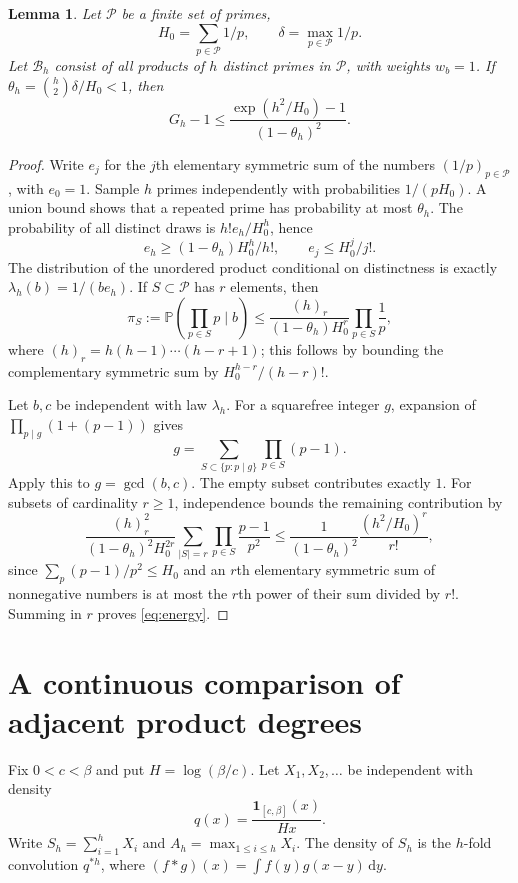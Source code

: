 \documentclass[11pt]{article}
\newtheorem{lemma}[theorem]{Lemma}
\theoremstyle{remark}\newtheorem{remark}[theorem]{Remark}
\newcommand{\Prob}{\mathbb P}
\newcommand{\ind}{\mathbf 1}
\newcommand{\dd}{\,\mathrm d}
\begin{document}
\begin{lemma}\label{lem:energy}
Let $\mathcal P$ be a finite set of primes,
\[
 H_0=\sum_{p\in\mathcal P}1/p,\qquad
 \delta=\max_{p\in\mathcal P}1/p.
\]
Let $\mathcal B_h$ consist of all products of $h$ distinct primes in $\mathcal P$, with weights $w_b=1$. If $\theta_h=\binom h2\delta/H_0<1$, then
\begin{equation}\label{eq:energy}
 G_h-1\le\frac{\exp(h^2/H_0)-1}{(1-\theta_h)^2}.
\end{equation}
\end{lemma}
\begin{proof}
Write $e_j$ for the $j$th elementary symmetric sum of the numbers $(1/p)_{p\in\mathcal P}$, with $e_0=1$. Sample $h$ primes independently with probabilities $1/(pH_0)$. A union bound shows that a repeated prime has probability at most $\theta_h$. The probability of all distinct draws is $h!e_h/H_0^h$, hence
\[
 e_h\ge (1-\theta_h)H_0^h/h!,\qquad e_j\le H_0^j/j!.
\]
The distribution of the unordered product conditional on distinctness is exactly $\lambda_h(b)=1/(be_h)$. If $S\subset\mathcal P$ has $r$ elements, then
\[
 \pi_S:=\Prob\left(\prod_{p\in S}p\mid b\right)
 \le\frac{(h)_r}{(1-\theta_h)H_0^r}\prod_{p\in S}\frac1p,
\]
where $(h)_r=h(h-1)\cdots(h-r+1)$; this follows by bounding the complementary symmetric sum by $H_0^{h-r}/(h-r)!$.

Let $b,c$ be independent with law $\lambda_h$. For a squarefree integer $g$, expansion of $\prod_{p\mid g}(1+(p-1))$ gives
\[
 g=\sum_{S\subset\{p:p\mid g\}}\prod_{p\in S}(p-1).
\]
Apply this to $g=\gcd(b,c)$. The empty subset contributes exactly $1$. For subsets of cardinality $r\ge1$, independence bounds the remaining contribution by
\[
 \frac{(h)_r^2}{(1-\theta_h)^2H_0^{2r}}
 \sum_{|S|=r}\prod_{p\in S}\frac{p-1}{p^2}
 \le\frac1{(1-\theta_h)^2}\frac{(h^2/H_0)^r}{r!},
\]
since $\sum_p(p-1)/p^2\le H_0$ and an $r$th elementary symmetric sum of nonnegative numbers is at most the $r$th power of their sum divided by $r!$. Summing in $r$ proves \eqref{eq:energy}.
\end{proof}

\section{A continuous comparison of adjacent product degrees}

Fix $0<c<\beta$ and put $H=\log(\beta/c)$. Let $X_1,X_2,\ldots$ be independent with density
\begin{equation}\label{eq:q}
 q(x)=\frac{\ind_{[c,\beta]}(x)}{Hx}.
\end{equation}
Write $S_h=\sum_{i=1}^hX_i$ and $A_h=\max_{1\le i\le h}X_i$. The density of $S_h$ is the $h$-fold convolution $q^{*h}$, where $(f*g)(x)=\int f(y)g(x-y)\dd y$.
\end{document}
